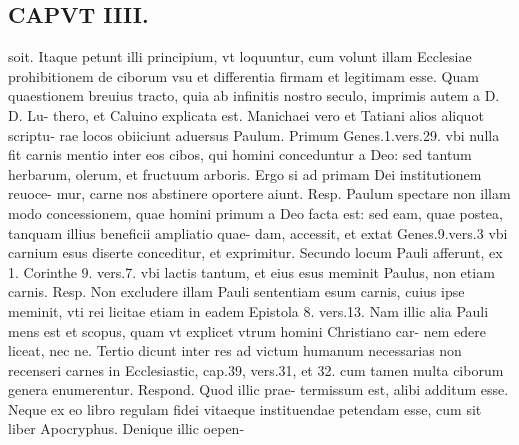 \documentclass{article}
\begin{document}
\begin{pages}
\section*{CAPVT  IIII. }\pstart soit. Itaque petunt illi principium, vt loquuntur, cum volunt illam Ecclesiae prohibitionem de ciborum vsu et differentia firmam et legitimam esse. Quam quaestionem breuius tracto, quia ab infinitis nostro seculo, imprimis autem a D. D. Lu- thero, et Caluino explicata est. Manichaei vero et Tatiani alios aliquot scriptu- rae locos obiiciunt aduersus Paulum. Primum Genes.1.vers.29. vbi nulla fit carnis mentio inter eos cibos, qui homini conceduntur a Deo: sed tantum herbarum, olerum, et fructuum arboris. Ergo si ad primam Dei institutionem reuoce- mur, carne nos abstinere oportere aiunt. Resp. Paulum spectare non illam modo concessionem, quae homini primum a Deo facta est: sed eam, quae postea, tanquam illius beneficii ampliatio quae- dam, accessit, et extat Genes.9.vers.3 vbi carnium esus diserte conceditur, et exprimitur. Secundo locum Pauli afferunt, ex 1. Corinthe 9. vers.7. vbi lactis tantum, et eius esus meminit Paulus, non etiam carnis. Resp. Non excludere illam Pauli sententiam esum carnis, cuius ipse meminit, vti rei licitae etiam in eadem Epistola 8. vers.13. Nam illic alia Pauli mens est et scopus, quam vt explicet vtrum homini Christiano car- nem edere liceat, nec ne. Tertio dicunt inter res ad victum humanum necessarias non recenseri carnes in Ecclesiastic, cap.39, vers.31, et 32. cum tamen multa ciborum genera enumerentur. Respond. Quod illic prae- termissum est, alibi additum esse. Neque ex eo libro regulam fidei vitaeque instituendae petendam esse, cum sit liber Apocryphus. Denique illic oepen-  \pend

\end{pages}
\end{document}
